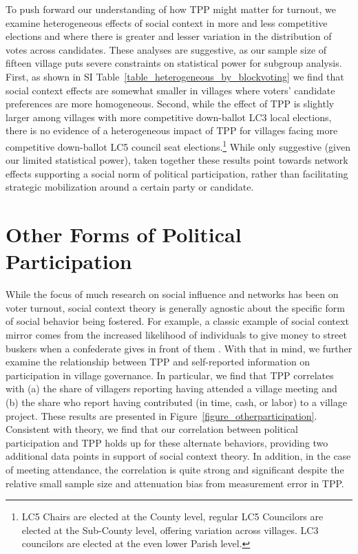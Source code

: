 \documentclass[12pt]{article}
\begin{document}
To push forward our understanding of how TPP might matter for turnout, we examine heterogeneous effects of social context in more and less competitive elections and where there is greater and lesser variation in the distribution of votes across candidates. These analyses are suggestive, as our sample size of fifteen village puts severe constraints on statistical power for subgroup analysis. First, as shown in SI Table~\ref{table_heterogeneous_by_blockvoting} we find that social context effects are somewhat smaller in villages where voters' candidate preferences are more homogeneous. Second, while the effect of TPP is slightly larger among villages with more competitive down-ballot LC3 local elections, there is no evidence of a heterogeneous impact of TPP for villages facing more competitive down-ballot LC5 council seat elections.\footnote{LC5 Chairs are elected at the County level, regular LC5 Councilors are elected at the Sub-County level, offering variation across villages. LC3 councilors are elected at the even lower Parish level.} While only suggestive (given our limited statistical power), taken together these results point towards network effects supporting a social norm of political participation, rather than facilitating strategic mobilization around a certain party or candidate.


\section{Other Forms of Political Participation}\label{section_other_political_participation}

While the focus of much research on social influence and networks has been on voter turnout, social context theory is generally agnostic about the specific form of social behavior being fostered. For example, a classic example of social context mirror comes from the increased likelihood of individuals to give money to street buskers when a confederate gives in front of them \citep{Cialdini:2015gt}. With that in mind, we further examine the relationship between TPP and self-reported information on participation in village governance. In particular, we find that TPP correlates with (a) the share of villagers reporting having attended a village meeting and (b) the share who report having contributed (in time, cash, or labor) to a village project. These results are presented in Figure~\ref{figure_otherparticipation}. Consistent with theory, we find that our correlation between political participation and TPP holds up for these alternate behaviors, providing two additional data points in support of social context theory. In addition, in the case of meeting attendance, the correlation is quite strong and significant despite the relative small sample size and attenuation bias from measurement error in TPP.
\end{document}
